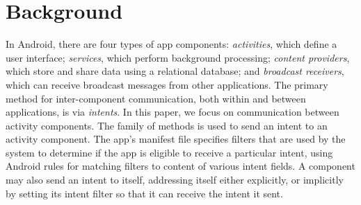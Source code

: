 \chapter{Background}
\label{sec:background}
In Android, there are four types of app components: {\em activities}, which
define a user interface; {\em services}, which perform background
processing; {\em content providers}, which store and share data using a
relational database; and {\em broadcast receivers}, which can receive
broadcast messages from other applications. The primary method for
inter-component communication, both within and between applications, is via {\em intents}.  
In this paper, we focus on communication between activity components.
The  family of methods is used to send an intent to an
activity component.
The app's
manifest file specifies filters that are used by the system to
determine if the app is eligible to receive a particular intent, using
Android rules for matching filters to content of various intent
fields. 
A component may also send an intent to itself, addressing itself either explicitly, or implicitly by setting its intent filter so that it can receive the intent it sent.

